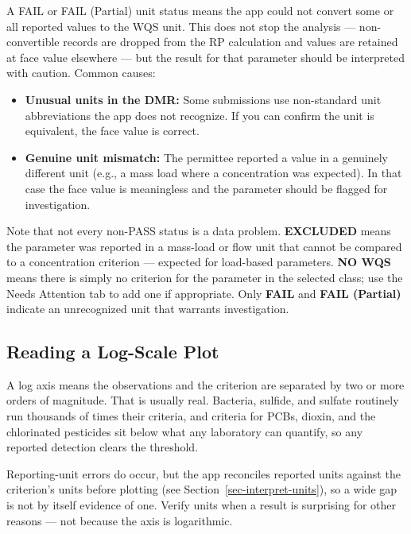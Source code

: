 \documentclass[
  11pt,
  letterpaper,
  DIV=11,
  numbers=noendperiod]{scrartcl}
\providecommand{\tightlist}{%
  \setlength{\itemsep}{0pt}\setlength{\parskip}{0pt}}
\begin{document}
A FAIL or FAIL (Partial) unit status means the app could not convert
some or all reported values to the WQS unit. This does not stop the
analysis --- non-convertible records are dropped from the RP calculation
and values are retained at face value elsewhere --- but the result for
that parameter should be interpreted with caution. Common causes:

\begin{itemize}
\tightlist
\item
  \textbf{Unusual units in the DMR:} Some submissions use non-standard
  unit abbreviations the app does not recognize. If you can confirm the
  unit is equivalent, the face value is correct.
\item
  \textbf{Genuine unit mismatch:} The permittee reported a value in a
  genuinely different unit (e.g., a mass load where a concentration was
  expected). In that case the face value is meaningless and the
  parameter should be flagged for investigation.
\end{itemize}

Note that not every non-PASS status is a data problem. \textbf{EXCLUDED}
means the parameter was reported in a mass-load or flow unit that cannot
be compared to a concentration criterion --- expected for load-based
parameters. \textbf{NO WQS} means there is simply no criterion for the
parameter in the selected class; use the Needs Attention tab to add one
if appropriate. Only \textbf{FAIL} and \textbf{FAIL (Partial)} indicate
an unrecognized unit that warrants investigation.

\subsection{Reading a Log-Scale Plot}\label{sec-interpret-unit-sanity}

A log axis means the observations and the criterion are separated by two
or more orders of magnitude. That is usually real. Bacteria, sulfide,
and sulfate routinely run thousands of times their criteria, and
criteria for PCBs, dioxin, and the chlorinated pesticides sit below what
any laboratory can quantify, so any reported detection clears the
threshold.

Reporting-unit errors do occur, but the app reconciles reported units
against the criterion's units before plotting (see
Section~\ref{sec-interpret-units}), so a wide gap is not by itself
evidence of one. Verify units when a result is surprising for other
reasons --- not because the axis is logarithmic.
\end{document}
